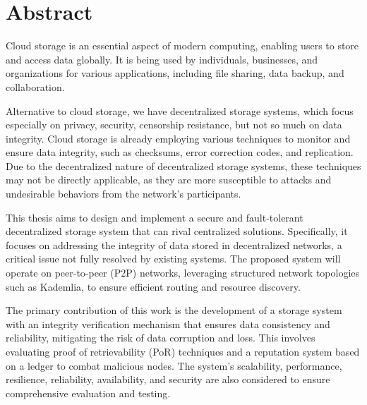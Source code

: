 \chapter{Abstract}
\label{abstract}

Cloud storage is an essential aspect of modern computing,
enabling users to store and access data globally.
It is being used by individuals, businesses, and organizations for various applications,
including file sharing, data backup, and collaboration.

Alternative to cloud storage, we have decentralized storage systems,
which focus especially on privacy, security, censorship resistance, but not so much on data integrity.
Cloud storage is already employing various techniques to monitor and ensure data integrity,
such as checksums, error correction codes, and replication.
Due to the decentralized nature of decentralized storage systems,
these techniques may not be directly applicable,
as they are more susceptible to attacks and undesirable behaviors from the network's participants.

This thesis aims to design and implement a secure and fault-tolerant decentralized storage system that can rival centralized solutions.
Specifically, it focuses on addressing the integrity of data stored in decentralized networks,
a critical issue not fully resolved by existing systems.
The proposed system will operate on peer-to-peer (P2P) networks,
leveraging structured network topologies such as Kademlia,
to ensure efficient routing and resource discovery.

The primary contribution of this work is the development of a storage system with
an integrity verification mechanism that ensures data consistency and reliability,
mitigating the risk of data corruption and loss.
This involves evaluating proof of retrievability (PoR) techniques and a reputation system based on a ledger to combat malicious nodes.
The system's scalability, performance, resilience, reliability, availability,
and security are also considered to ensure comprehensive evaluation and testing.

\vfill
